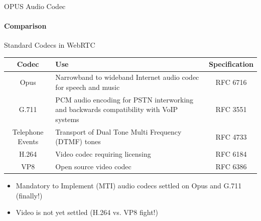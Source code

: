 \begin{frame}{OPUS Audio Codec}\framesubtitle{Comparison}
\end{frame}

\begin{frame}{Standard Codecs in WebRTC}
\begin{small}
\begin{longtable}{|c|p{}|c|}
\hline
Codec & Use & Specification\\
\hline
\hline
Opus & Narrowband to wideband Internet audio codec for speech and music & RFC 6716\\
\hline
G.711 & PCM audio encoding for PSTN interworking and backwards compatibility with VoIP systems & RFC 3551\\
\hline
Telephone Events & Transport of Dual Tone Multi Frequency (DTMF) tones & RFC 4733\\
\hline
H.264 & Video codec requiring licensing & RFC 6184\\
\hline
VP8 & Open source video codec & RFC 6386\\
\hline
\end{longtable}
\end{small}
\begin{itemize}
\item Mandatory to Implement (MTI) audio codecs settled on Opus and G.711 (finally!)
\item Video is not yet settled (H.264 vs. VP8 fight!)
\end{itemize}
\end{frame}


